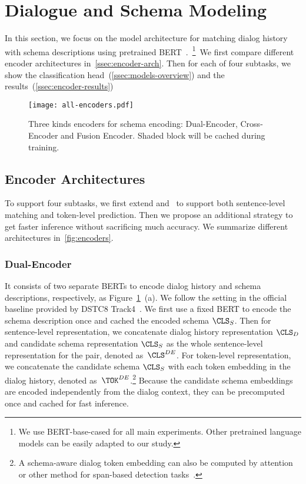 \section[Dialogue and Schema Modeling]{Dialogue and Schema Modeling}
\label{sec:sgd:models}
In this section, we focus on the model architecture for matching
dialog history with schema descriptions using pretrained
BERT~\cite{devlin2019bert}.~\footnote{We use BERT-base-cased for all
  main experiments. Other pretrained language models can be easily
  adapted to our study.}~We first compare different encoder
architectures in~\autoref{ssec:encoder-arch}. Then for each of four
subtasks, we show the classification
head~(\autoref{ssec:models-overview}) and the results~(\autoref{ssec:encoder-results})

\begin{figure}[!t]
\centering
  \texttt{[image: all-encoders.pdf]}
  \caption{\label{fig:encoders} Three kinds encoders for schema
    encoding: Dual-Encoder, Cross-Encoder and Fusion Encoder. Shaded
    block will be cached during training.}
\end{figure}

\subsection{Encoder Architectures}
\label{ssec:encoder-arch}
To support four subtasks, we first extend \DE and \CE~to support both
sentence-level matching and token-level prediction. Then we propose an
additional \FE strategy to get faster inference without sacrificing
much accuracy. We summarize different architectures
in~\autoref{fig:encoders}.

\subsubsection{Dual-Encoder}
\label{sssec:sgd:dual-encoder}

It consists of two separate BERTs to encode dialog history and schema
descriptions, respectively, as Figure~\ref{fig:encoders}~(a). We follow
the setting in the official baseline provided by DSTC8
Track4~\cite{rastogi2020schema}. We first use a fixed BERT to encode
the schema description once and cached the encoded schema
$\CLS_{S}$. Then for sentence-level representation, we concatenate
dialog history representation $\CLS_{D}$ and candidate schema
representation $\CLS_{S}$ as the whole sentence-level representation
for the pair, denoted as~${\CLS^{DE}}$.  For token-level
representation, we concatenate the candidate schema $\CLS_{S}$ with
each token embedding in the dialog history, denoted
as~${\TOK^{DE}}$.\footnote{A schema-aware dialog token embedding can
  also be computed by attention or other method for span-based
  detection tasks~\citep{humeau2019poly, noroozi2020fast}.} Because the
candidate schema embeddings are encoded independently from the dialog
context, they can be precomputed once and cached for fast inference.

